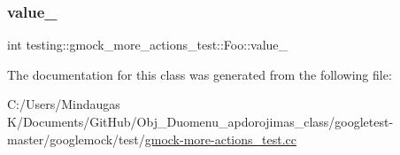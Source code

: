 \subsubsection{\texorpdfstring{value\_}{value\_}}
{\footnotesize\ttfamily int testing\+::gmock\+\_\+more\+\_\+actions\+\_\+test\+::\+Foo\+::value\+\_\+\hspace{0.3cm}{\ttfamily [private]}}



The documentation for this class was generated from the following file\+:\begin{DoxyCompactItemize}
\item 
C\+:/\+Users/\+Mindaugas K/\+Documents/\+Git\+Hub/\+Obj\+\_\+\+Duomenu\+\_\+apdorojimas\+\_\+class/googletest-\/master/googlemock/test/\mbox{\hyperlink{googletest-master_2googlemock_2test_2gmock-more-actions__test_8cc}{gmock-\/more-\/actions\+\_\+test.\+cc}}\end{DoxyCompactItemize}
